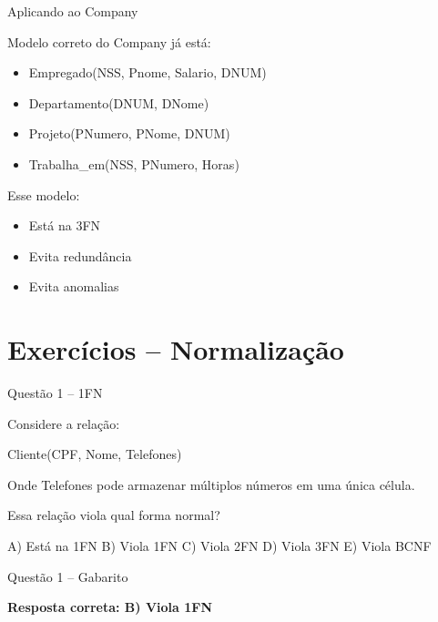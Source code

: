 \documentclass{beamer}
\begin{document}
\begin{frame}{Aplicando ao Company}

Modelo correto do Company já está:

\begin{itemize}
    \item Empregado(NSS, Pnome, Salario, DNUM)
    \item Departamento(DNUM, DNome)
    \item Projeto(PNumero, PNome, DNUM)
    \item Trabalha\_em(NSS, PNumero, Horas)
\end{itemize}

Esse modelo:

\begin{itemize}
    \item Está na 3FN
    \item Evita redundância
    \item Evita anomalias
\end{itemize}

\end{frame}



\section{Exercícios – Normalização}

\begin{frame}{Questão 1 – 1FN}

Considere a relação:

Cliente(CPF, Nome, Telefones)

Onde Telefones pode armazenar múltiplos números
em uma única célula.

Essa relação viola qual forma normal?

A) Está na 1FN  
B) Viola 1FN  
C) Viola 2FN  
D) Viola 3FN  
E) Viola BCNF  

\end{frame}





\begin{frame}{Questão 1 – Gabarito}

\Large \textbf{Resposta correta: B) Viola 1FN}

\end{frame}
\end{document}
